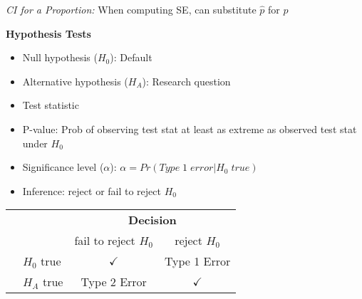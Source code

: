 \documentclass[8pt]{article}
\begin{document}
\begin{multicols}{2}
\textit{CI for a Proportion:}
When computing SE, can substitute $\hat{p}$ for $p$


\vspace{1em}

\textbf{Hypothesis Tests}

\begin{itemize}
    \item Null hypothesis ($H_0$): Default
    \item Alternative hypothesis ($H_A$): Research question
    \item Test statistic
    \item P-value: Prob of observing test stat at least as extreme as observed test stat under $H_0$
    \item Significance level ($\alpha$): $\alpha=Pr(Type\; 1\; error | H_0\; true)$
    \item Inference: reject or fail to reject $H_0$
\end{itemize}

\begin{center}
\begin{tabular}{l l | c c}
\multicolumn{2}{c}{} & \multicolumn{2}{c}{\textbf{Decision}} \\
& & fail to reject $H_0$ &  reject $H_0$ \\
  \cline{2-4}
& $H_0$ true & $\checkmark$ &  Type 1 Error \\
\raisebox{1.5ex}{\textbf{Truth}} & $H_A$ true & Type 2 Error & $\checkmark$ \\
  \cline{2-4}
\end{tabular}
\end{center}


\end{multicols} %
\end{document}
